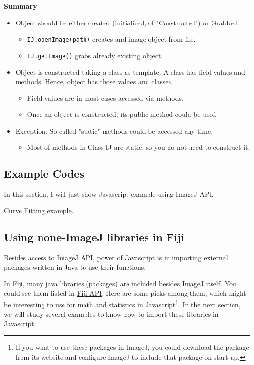 \documentclass[11pt,a4paper,oneside]{report}
\newcommand{\ilcom}[1]{\texttt{\small#1}}
\begin{document}
\textbf{Summary}
\begin{itemize}
\item Object should be either created (initialized, of "Constructed") or Grabbed. 
\begin{itemize}
\item \ilcom{IJ.openImage(path)} creates and image object from file.
\item \ilcom{IJ.getImage()} grabs already existing object. 
\end{itemize}
\item Object is constructed taking a class as template. A class has field values and methods. 
Hence, object has those values and classes. 
\begin{itemize}
\item Field values are in most cases accessed via methods.
\item Once an object is constructed, its public method could be used
\end{itemize}
\item Exception: So called "static" methods could be accessed any time. 
\begin{itemize}
\item Most of methods in Class IJ are static, so you do not need to construct
it.
\end{itemize}
\end{itemize}

\subsection{Example Codes}

In this section, I will just show Javascript example using ImageJ API. 

Curve Fitting example. 



\subsection{Using none-ImageJ libraries in Fiji}

Besides access to ImageJ API, power of Javascript is in importing external packages 
written in Java to use their functions.

In Fiji, many java libraries (packages) are included besides ImageJ itself. 
You could see them listed in \href{http://pacific.mpi-cbg.de/javadoc/}{Fiji API}. 
Here are some picks among them, which might be interesting to use for math and statistics 
in Javascript\footnote{ If you want to use these packages in ImageJ, 
you could download the package from its website and configure ImageJ 
to include that package on start up.}. In the next section, 
we will study several examples to know how to import these libraries in Javascript. 
\end{document}
